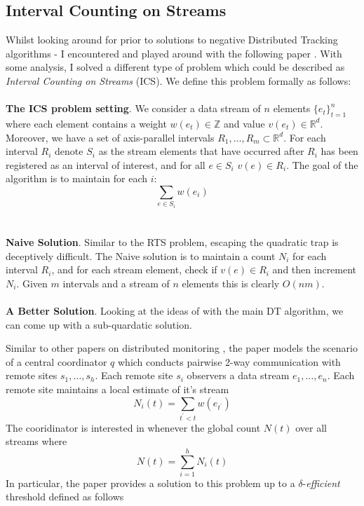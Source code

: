 \documentclass{article}
\begin{document}
\newpage
\subsection*{Interval Counting on Streams}

Whilst looking around for prior to solutions to negative Distributed Tracking algorithms - I encountered and played around with the following paper \cite{10.1145/1142473.1142507}. With some analysis, I solved a different type of problem which could be described as \textit{Interval Counting on Streams} (ICS). We define this problem formally as follows: \\
\\
\textbf{The ICS problem setting}. We consider a data stream of $n$ elements $\{e_t\}_{t=1}^{n}$ where each element contains a weight $w(e_t)\in\mathbb{Z}$ and value $v(e_t)\in\mathbb{R}^d$. Moreover, we have a set of axis-parallel intervals $R_1,\dots,R_m\subset\mathbb{R}^d$. For each interval $R_i$ denote $S_i$ as the stream elements that have occurred after $R_i$ has been registered as an interval of interest, and for all $e\in S_i$ $v(e)\in R_i$. The goal of the algorithm is to maintain for each $i$: 
$$\sum_{e\in S_i}w(e_i)$$ \\
\\
\textbf{Naive Solution}. Similar to the RTS problem, escaping the quadratic trap is deceptively difficult. The Naive solution is to maintain a count $N_i$ for each interval $R_i$, and for each stream element, check if $v(e)\in R_i$ and then increment $N_i$. Given $m$ intervals and a stream of $n$ elements this is clearly $O(nm)$. \\
\\
\textbf{A Better Solution}. Looking at the ideas of \cite{10.1145/1142473.1142507} with the main DT algorithm, we can come up with a sub-quardatic solution.


Similar to other papers on distributed monitoring \cite{Cormode2011}, the paper models the scenario of a central coordinator $q$ which conducts pairwise 2-way communication with remote sites $s_1, \dots, s_h$. Each remote site $s_i$ observers a data stream $e_1, \dots, e_n$. Each remote site maintains a local estimate of it's stream
$$N_i(t) = \sum_{t^\prime < t} w(e_{t^\prime})$$
The cooridinator is interested in whenever the global count $N(t)$ over all streams where
$$N(t) = \sum_{i=1}^{h} N_i(t)$$
In particular, the paper provides a solution to this problem up to a $\delta$-\textit{efficient} threshold defined as follows 
\end{document}
